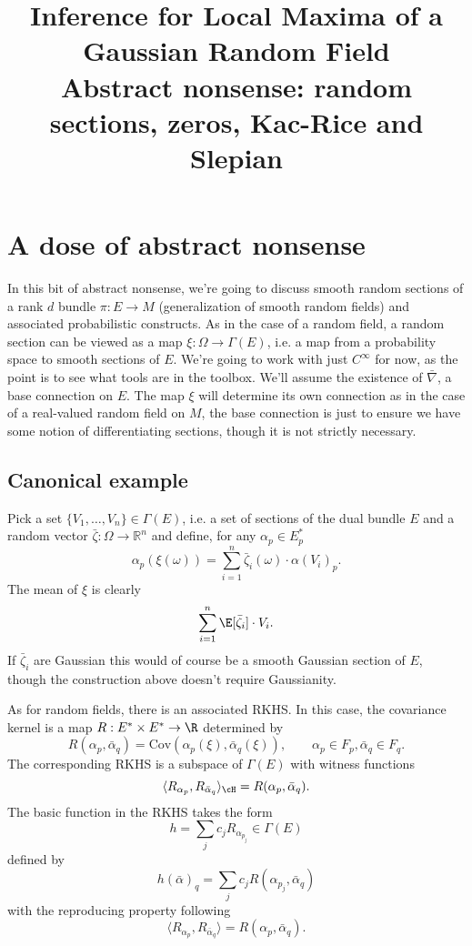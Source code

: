 \documentclass{article}
\title{ {\bf Inference for Local Maxima of a Gaussian Random Field} \\ Abstract nonsense: random sections, zeros, Kac-Rice and Slepian}
\begin{document}
	\maketitle
	\RaggedRight

\section{A dose of abstract nonsense}

In this bit of abstract nonsense, we're going to discuss smooth random
sections of a rank $d$ bundle $\pi:E \to M$ (generalization of smooth random
fields) and associated probabilistic constructs. As in the case of a random field, a random section can
be viewed as a map $\xi:\Omega \to \Gamma(E)$, i.e. a map from a probability space to smooth sections of $E$.
We're going to work with just $C^{\infty}$ for now, as the point is to see what tools are in the toolbox.
We'll assume the existence of $\bar{\nabla}$, a base connection on $E$. The map $\xi$ will determine
its own connection as in the case of a real-valued random field on $M$, the base connection is just to
ensure we have some notion of differentiating sections, though it is not strictly necessary.

\subsection{Canonical example}

Pick a set $\{V_1, \dots, V_n\} \in \Gamma(E)$, i.e. a set of sections of the dual bundle $E$ and
a random vector $\bar{\zeta}:\Omega \rightarrow \mathbb{R}^n$ and define, for any $\alpha_p \in E_p^*$
\begin{equation}
  \label{eq:process}
\alpha_p(\xi(\omega)) = \sum_{i=1}^n \bar{\zeta}_i(\omega) \cdot \alpha(V_i)_p.
\end{equation}
The mean of $\xi$ is clearly
$$
\sum_{i=1}^n \E[\bar{\zeta}_i] \cdot V_i.
$$
If $\bar{\zeta}_i$ are Gaussian this would of course be a smooth Gaussian section of $E$, though
the construction above doesn't require Gaussianity.

As for random fields, there is an associated RKHS. In this case, the covariance kernel is a map $R:E^* \times E^* \to \R$ determined by
$$
R(\alpha_p, \bar{\alpha}_q) = \text{Cov}(\alpha_p(\xi), \bar{\alpha}_q(\xi)), \qquad \alpha_p \in F_p, \bar{\alpha}_q \in F_q.
$$
The corresponding  RKHS is a subspace of $\Gamma(E)$ with witness functions
$$
\langle R_{\alpha_p}, R_{\bar{\alpha}_q} \rangle_{\cH} = R(\alpha_p, \bar{\alpha}_q).
$$
The basic function in the RKHS takes the form
$$
h = \sum_j c_j R_{\alpha_{p_j}}   \in \Gamma(E)
$$
defined by
$$
h(\bar{\alpha})_q = \sum_j c_j R(\alpha_{p_j}, \bar{\alpha}_q)
$$
with the reproducing property following
$$
\langle R_{\alpha_p}, R_{\bar{\alpha}_q} \rangle = R(\alpha_p, \bar{\alpha}_q).
$$
\end{document}
